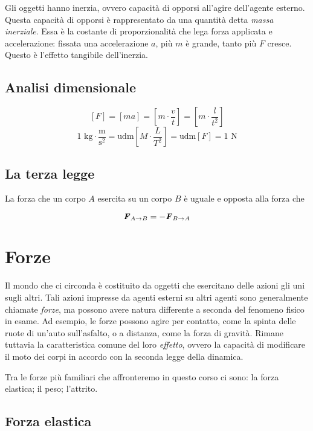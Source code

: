 \noindent Gli oggetti hanno inerzia, ovvero capacità di opporsi all'agire dell'agente
esterno. Questa capacità di opporsi è rappresentato da una quantità detta
\textit{massa inerziale}. Essa è la costante di proporzionalità che lega forza applicata
e accelerazione: fissata una accelerazione $a$, più $m$ è grande, tanto più $F$ cresce.
Questo è l'effetto tangibile dell'inerzia.

\subsection*{Analisi dimensionale}
\[ [F] = [ma] = \left[m\cdot\frac{v}{t}\right] = \left[m\cdot\frac{l}{t^2}\right]  \]
\[ 1\text{ kg}\cdot\frac{\text{m}}{\text{s}^2} = \text{udm}\left[M\cdot\frac{L}{T^2}\right] = \text{udm}[F] = 1\text{ N} \]



\subsection{La terza legge}
\begin{tcolorbox}[colback = red!30, colframe = red!30!black, title = {Terza legge della dinamica (legge di azione e reazione)}]
La forza che un corpo $A$ esercita su un corpo $B$ è uguale e opposta alla forza
che

\[ \textbf{\textit{F}}_{A\to B} = -\textbf{\textit{F}}_{B\to A} \]
\end{tcolorbox}




\section{Forze}
Il mondo che ci circonda è costituito da oggetti che esercitano delle azioni gli
uni sugli altri. Tali azioni impresse da agenti esterni su altri agenti sono
generalmente chiamate \textit{forze}, ma possono avere natura differente a seconda
del fenomeno fisico in esame. Ad esempio, le forze possono agire per contatto, come
la spinta delle ruote di un'auto sull'asfalto, o a distanza, come la forza di gravità.
Rimane tuttavia la caratteristica comune del loro \textit{effetto}, ovvero la capacità
di modificare il moto dei corpi in accordo con la seconda legge della dinamica.

Tra le forze più familiari che affronteremo in questo corso ci sono:
la forza elastica; il peso; l'attrito.

\subsection{Forza elastica}

